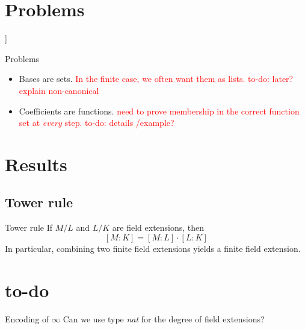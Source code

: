 \documentclass[%
	sans,
	12pt,
]{beamer}
\newcommand{\bad}[1]{\textcolor{red}{#1}}
\begin{document}
\section{Problems}]
\begin{frame}{Problems}
\begin{itemize}
\item Bases are sets.
\bad{In the finite case, we often want them as lists. to-do: later? explain non-canonical}
\item Coefficients are functions.
\bad{need to prove membership in the correct function set at \emph{every} step.
	 to-do: details /example?}
\end{itemize}
\end{frame}

\section{Results}
\subsection{Tower rule}
\begin{frame}{Tower rule}
If $M/L$ and $L/K$ are field extensions, then
\[[M : K] = [M : L] \cdot [L : K]\]\pause %
In particular, combining two finite field extensions yields a finite field extension. %
\end{frame}

\section{to-do}
\begin{frame}{Encoding of $\infty$}
Can we use type \emph{nat} for the degree of field extensions?\pause
{}
\end{frame}
\end{document}
